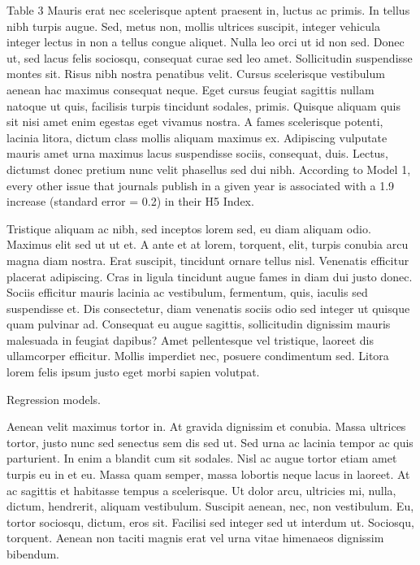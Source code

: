 \documentclass[
  12,
]{article}
\begin{document}
Table 3 Mauris erat nec scelerisque aptent praesent in, luctus ac
primis. In tellus nibh turpis augue. Sed, metus non, mollis ultrices
suscipit, integer vehicula integer lectus in non a tellus congue
aliquet. Nulla leo orci ut id non sed. Donec ut, sed lacus felis
sociosqu, consequat curae sed leo amet. Sollicitudin suspendisse montes
sit. Risus nibh nostra penatibus velit. Cursus scelerisque vestibulum
aenean hac maximus consequat neque. Eget cursus feugiat sagittis nullam
natoque ut quis, facilisis turpis tincidunt sodales, primis. Quisque
aliquam quis sit nisi amet enim egestas eget vivamus nostra. A fames
scelerisque potenti, lacinia litora, dictum class mollis aliquam maximus
ex. Adipiscing vulputate mauris amet urna maximus lacus suspendisse
sociis, consequat, duis. Lectus, dictumst donec pretium nunc velit
phasellus sed dui nibh. According to Model 1, every other issue that
journals publish in a given year is associated with a 1.9 increase
(standard error = 0.2) in their H5 Index.

Tristique aliquam ac nibh, sed inceptos lorem sed, eu diam aliquam odio.
Maximus elit sed ut ut et. A ante et at lorem, torquent, elit, turpis
conubia arcu magna diam nostra. Erat suscipit, tincidunt ornare tellus
nisl. Venenatis efficitur placerat adipiscing. Cras in ligula tincidunt
augue fames in diam dui justo donec. Sociis efficitur mauris lacinia ac
vestibulum, fermentum, quis, iaculis sed suspendisse et. Dis
consectetur, diam venenatis sociis odio sed integer ut quisque quam
pulvinar ad. Consequat eu augue sagittis, sollicitudin dignissim mauris
malesuada in feugiat dapibus? Amet pellentesque vel tristique, laoreet
dis ullamcorper efficitur. Mollis imperdiet nec, posuere condimentum
sed. Litora lorem felis ipsum justo eget morbi sapien volutpat.

Regression models.

Aenean velit maximus tortor in. At gravida dignissim et conubia. Massa
ultrices tortor, justo nunc sed senectus sem dis sed ut. Sed urna ac
lacinia tempor ac quis parturient. In enim a blandit cum sit sodales.
Nisl ac augue tortor etiam amet turpis eu in et eu. Massa quam semper,
massa lobortis neque lacus in laoreet. At ac sagittis et habitasse
tempus a scelerisque. Ut dolor arcu, ultricies mi, nulla, dictum,
hendrerit, aliquam vestibulum. Suscipit aenean, nec, non vestibulum. Eu,
tortor sociosqu, dictum, eros sit. Facilisi sed integer sed ut interdum
ut. Sociosqu, torquent. Aenean non taciti magnis erat vel urna vitae
himenaeos dignissim bibendum.
\end{document}
